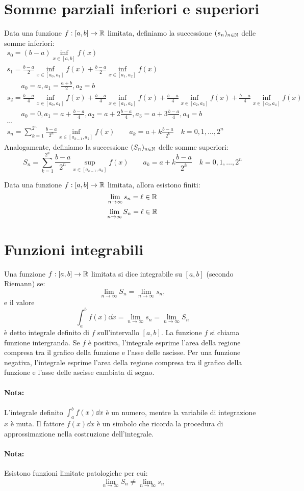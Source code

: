 \section{Somme parziali inferiori e superiori}
Data una funzione $f:[a,b]\rightarrow\mathbb{R}$ limitata, definiamo la successione $(s_n)_{n\in\mathbb{N}}$ delle somme inferiori:
\begin{gather*}
s_0 = (b-a) \inf_{x\in[a,b]} f(x) \\
s_1 = \frac{b-a}{2} \inf_{x\in[a_0,a_1]} f(x) + \frac{b-a}{2} \inf_{x\in[a_1,a_2]} f(x) \\
\qquad a_0 = a, a_1=\frac{a+b}{2},a_2=b \\
s_2 = \frac{b-a}{4}\inf_{x\in[a_0,a_1]}f(x) + \frac{b-a}{4}\inf_{x\in[a_1,a_2]}f(x) + \frac{b-a}{4}\inf_{x\in[a_2,a_3]}f(x) + \frac{b-a}{4}\inf_{x\in[a_3,a_4]}f(x) \\
\qquad a_0=0,a_1=a+\frac{b-a}{4},a_2=a+2\frac{b-a}{4},a_3=a+3\frac{b-a}{4},a_4=b \\
\dots \\
s_n=\sum_{k=1}^{2^n}\frac{b-a}{2^n}\inf_{x\in[a_{k-1},a_k]}f(x) \qquad a_k=a+k\frac{b-a}{2^k} \quad k=0,1,\dots,2^n 
\end{gather*}
Analogamente, definiamo la successione $(S_n)_{n\in\mathbb{N}}$ delle somme superiori:
\[S_n=\sum_{k=1}^{2^n}\frac{b-a}{2^n}\sup_{x\in[a_{k-1},a_k]}f(x) \qquad a_k=a+k\frac{b-a}{2^k} \quad k=0,1,\dots,2^n\]

\begin{prop}
Data una funzione $f:[a,b]\rightarrow\mathbb{R}$ limitata, allora esistono finiti:
\[\lim_{n\to\infty}{s_n}=\ell\in\mathbb{R}\]
\[\lim_{n\to\infty}{S_n}=\ell\in\mathbb{R}\]
\end{prop}

\section{Funzioni integrabili}
Una funzione $f:[a,b]\rightarrow\mathbb{R}$ limitata si dice integrabile su $[a,b]$ (secondo Riemann) se:
\[\lim_{n\to\infty}{S_n}=\lim_{n\to\infty}{s_n},\]
e il valore
\[\int_a^b f(x)\dd x=\lim_{n\to\infty}{s_n}=\lim_{n\to\infty}{S_n}\]
è detto integrale definito di $f$ sull'intervallo $[a,b]$. La funzione $f$ si chiama funzione intergranda.
Se $f$ è positiva, l'integrale esprime l'area della regione compresa tra il grafico della funzione e l'asse delle ascisse. Per una funzione negativa, l'integrale esprime l'area della regione compresa tra il grafico della funzione e l'asse delle ascisse cambiata di segno.

\paragraph{Nota:} L'integrale definito $\int_a^b f(x)\dd x$ è un numero, mentre la variabile di integrazione $x$ è muta. Il fattore $f(x)\dd x$ è un simbolo che ricorda la procedura di approssimazione nella costruzione dell'integrale.

\paragraph{Nota:} Esistono funzioni limitate patologiche per cui:
\[\lim_{n\to\infty}{S_n}\neq\lim_{n\to\infty}{s_n}\]